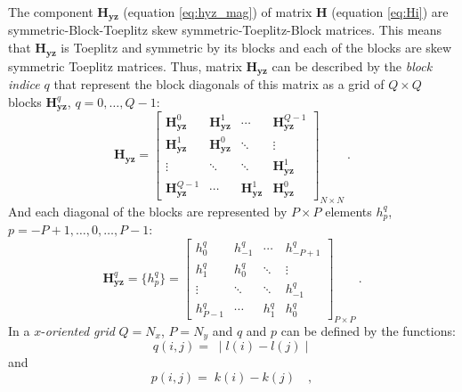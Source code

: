 The component $\mathbf{H_{yz}}$ (equation \ref{eq:hyz_mag}) of matrix $\mathbf{H}$ (equation \ref{eq:Hi}) are symmetric-Block-Toeplitz skew symmetric-Toeplitz-Block matrices. This means that $\mathbf{H_{yz}}$ is Toeplitz and symmetric by its blocks and each of the blocks are skew symmetric Toeplitz matrices.
Thus, matrix $\mathbf{H_{yz}}$ can be described by the \textit{block indice} $q$ that represent the block diagonals of this matrix as a grid of $Q \times Q$ blocks $\mathbf{H}^{q}_\mathbf{yz}$, $q = 0, \dots, Q - 1$:
\begin{equation}
	\mathbf{H_{yz}} = \begin{bmatrix}
		\mathbf{H}^{0}_\mathbf{yz}  & \mathbf{H}^{1}_\mathbf{yz} & \cdots         & \mathbf{H}^{Q-1}_\mathbf{yz} \\
		\mathbf{H}^{1}_\mathbf{yz}  & \mathbf{H}^{0}_\mathbf{yz} & \ddots         & \vdots           \\ 
		\vdots           & \ddots         & \ddots         & \mathbf{H}^{1}_\mathbf{yz}   \\
		\mathbf{H}^{Q-1}_\mathbf{yz} & \cdots         & \mathbf{H}^{1}_\mathbf{yz} & \mathbf{H}^{0}_\mathbf{yz}                
	\end{bmatrix}_{N \times N} \: .
	\label{eq:BTTB_Hyz}
\end{equation}
And each diagonal of the blocks are represented by $P \times P$ elements $h^{q}_{p}$, $p = -P + 1, \dots, 0, \dots, P - 1$:
\begin{equation}
	\mathbf{H}^{q}_\mathbf{yz} =  \{h^{q}_p\} = \begin{bmatrix}
		h^{q}_{0}   & h^{q}_{-1} & \cdots    & h^{q}_{-P+1} \\
		h^{q}_{1}   & h^{q}_{0} & \ddots    & \vdots           \\ 
		\vdots      & \ddots    & \ddots    & h^{q}_{-1}   \\
		h^{q}_{P-1} & \cdots    & h^{q}_{1} & h^{q}_{0}                 
	\end{bmatrix}_{P \times P} \: .
	\label{eq:Hyz_block}
\end{equation}
In a $x$-\textit{oriented grid} $Q = N_{x}$, $P = N_{y}$ and $q$ and $p$ can be defined by the functions:
\begin{equation}
	q(i, j) = \; \mid l(i) - l(j) \mid
	\label{eq:Hyz-q-x-oriented}
\end{equation}
and
\begin{equation}
	p(i, j) = \; k(i) - k(j) \quad ,
	\label{eq:Hyz-p-x-oriented}
\end{equation}
